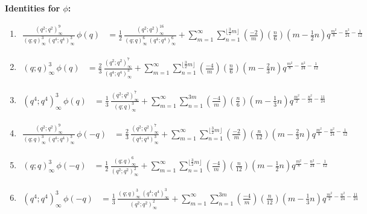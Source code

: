 \documentclass[11pt,reqno]{amsart}
\renewcommand{\=}{\;=\;}
\theoremstyle{myremark}
\begin{document}
\bigskip
\textbf{Identities for $\phi$:}
\begin{enumerate}[label=II.\arabic*.,ref=II.\arabic*, itemsep=1em]
\item $\displaystyle
\begin{aligned}
\frac{(q^2;q^2)_\infty^9}{(q;q)_\infty^3\,(q^4;q^4)_\infty^3}\,\phi(q)
&=
\frac{1}{2}\,\frac{(q^2;q^2)_\infty^{16}}{(q;q)_\infty^6\,(q^4;q^4)_\infty^6}
+\sum_{m=1}^\infty\sum_{n=1}^{\lfloor \frac{3}{2}m \rfloor}
\left(\frac{-2}{m}\right)\left(\frac{n}{6}\right)\left(m-\frac{1}{2}n\right)
q^{\frac{m^2}{8}-\frac{n^2}{24}-\frac{1}{12}}
\end{aligned}\label{1}
$
\item $\displaystyle
\begin{aligned}
(q;q)_\infty^3\,\phi(q)
&=
\frac{2}{3}\,\frac{(q^2;q^2)_\infty^7}{(q^4;q^4)_\infty^3}
+\sum_{m=1}^\infty\sum_{n=1}^{\lfloor \frac{3}{2}m \rfloor}
\left(\frac{-4}{m}\right)\left(\frac{n}{6}\right)\left(m-\frac{2}{3}n\right)
q^{\frac{m^2}{8}-\frac{n^2}{24}-\frac{1}{12}}
\end{aligned}\label{2}
$
\item $\displaystyle
\begin{aligned}
(q^4;q^4)_\infty^3\,\phi(q)
&=
\frac{1}{3}\,\frac{(q^2;q^2)_\infty^7}{(q;q)_\infty^3}
+\sum_{m=1}^\infty\sum_{n=1}^{3m}
\left(\frac{-4}{m}\right)\left(\frac{n}{6}\right)\left(m-\frac{1}{3}n\right)
q^{\frac{m^2}{2}-\frac{n^2}{24}-\frac{11}{24}}
\end{aligned}\label{3}
$
\item $\displaystyle
\begin{aligned}
\frac{(q^2;q^2)_\infty^9}{(q;q)_\infty^3\,(q^4;q^4)_\infty^3}\,\phi(-q)
&=
\frac{2}{3}\,\frac{(q^2;q^2)_\infty^{7}}{(q^4;q^4)_\infty^3}
+\sum_{m=1}^\infty\sum_{n=1}^{\lfloor \frac{3}{2}m \rfloor}
\left(\frac{-2}{m}\right)\left(\frac{n}{12}\right)\left(m-\frac{2}{3}n\right)
q^{\frac{m^2}{8}-\frac{n^2}{24}-\frac{1}{12}}
\end{aligned}\label{4}
$
\item $\displaystyle
\begin{aligned}
(q;q)_\infty^3\,\phi(-q)
&=
\frac{1}{2}\,\frac{(q;q)_\infty^6}{(q^2;q^2)_\infty^2}
+\sum_{m=1}^\infty\sum_{n=1}^{\lfloor \frac{3}{2}m \rfloor}
\left(\frac{-4}{m}\right)\left(\frac{n}{12}\right)\left(m-\frac{1}{2}n\right)
q^{\frac{m^2}{8}-\frac{n^2}{24}-\frac{1}{12}}
\end{aligned}\label{5}
$
\item $\displaystyle
\begin{aligned}
(q^4;q^4)_\infty^3\,\phi(-q)
&=
\frac{1}{3}\,\frac{(q;q)_\infty^3\,(q^4;q^4)_\infty^3}{(q^2;q^2)_\infty^2}
+\sum_{m=1}^\infty\sum_{n=1}^{3m}
\left(\frac{-4}{m}\right)\left(\frac{n}{12}\right)\left(m-\frac{1}{3}n\right)
q^{\frac{m^2}{2}-\frac{n^2}{24}-\frac{11}{24}}
\end{aligned}\label{6}
$
\end{enumerate}
\end{document}
